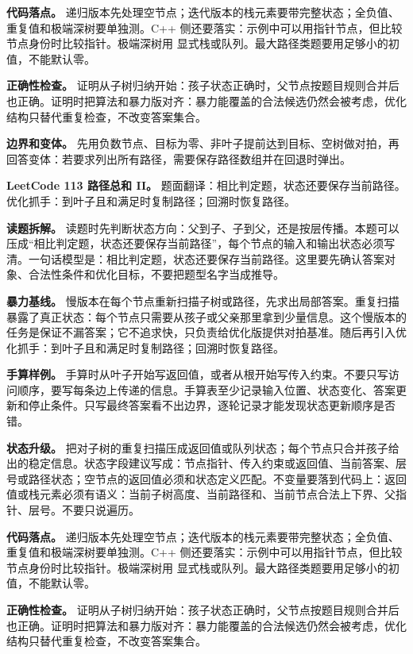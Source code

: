\textbf{代码落点。} 递归版本先处理空节点；迭代版本的栈元素要带完整状态；全负值、重复值和极端深树要单独测。C++ 侧还要落实：示例中可以用指针节点，但比较节点身份时比较指针。极端深树用  显式栈或队列。最大路径类题要用足够小的初值，不能默认零。

\textbf{正确性检查。} 证明从子树归纳开始：孩子状态正确时，父节点按题目规则合并后也正确。证明时把算法和暴力版对齐：暴力能覆盖的合法候选仍然会被考虑，优化结构只替代重复检查，不改变答案集合。

\textbf{边界和变体。} 先用负数节点、目标为零、非叶子提前达到目标、空树做对拍，再回答变体：若要求列出所有路径，需要保存路径数组并在回退时弹出。

\noindent\textbf{LeetCode 113 路径总和 II。} 题面翻译：相比判定题，状态还要保存当前路径。优化抓手：到叶子且和满足时复制路径；回溯时恢复路径。

\textbf{读题拆解。} 读题时先判断状态方向：父到子、子到父，还是按层传播。本题可以压成“相比判定题，状态还要保存当前路径”，每个节点的输入和输出状态必须写清。一句话模型是：相比判定题，状态还要保存当前路径。这里要先确认答案对象、合法性条件和优化目标，不要把题型名字当成推导。

\textbf{暴力基线。} 慢版本在每个节点重新扫描子树或路径，先求出局部答案。重复扫描暴露了真正状态：每个节点只需要从孩子或父亲那里拿到少量信息。这个慢版本的任务是保证不漏答案；它不追求快，只负责给优化版提供对拍基准。随后再引入优化抓手：到叶子且和满足时复制路径；回溯时恢复路径。

\textbf{手算样例。} 手算时从叶子开始写返回值，或者从根开始写传入约束。不要只写访问顺序，要写每条边上传递的信息。手算表至少记录输入位置、状态变化、答案更新和停止条件。只写最终答案看不出边界，逐轮记录才能发现状态更新顺序是否错。

\textbf{状态升级。} 把对子树的重复扫描压成返回值或队列状态；每个节点只合并孩子给出的稳定信息。状态字段建议写成：节点指针、传入约束或返回值、当前答案、层号或路径状态；空节点的返回值必须和状态定义匹配。不变量要落到代码上：返回值或栈元素必须有语义：当前子树高度、当前路径和、当前节点合法上下界、父指针、层号。不要只说遍历。

\textbf{代码落点。} 递归版本先处理空节点；迭代版本的栈元素要带完整状态；全负值、重复值和极端深树要单独测。C++ 侧还要落实：示例中可以用指针节点，但比较节点身份时比较指针。极端深树用  显式栈或队列。最大路径类题要用足够小的初值，不能默认零。

\textbf{正确性检查。} 证明从子树归纳开始：孩子状态正确时，父节点按题目规则合并后也正确。证明时把算法和暴力版对齐：暴力能覆盖的合法候选仍然会被考虑，优化结构只替代重复检查，不改变答案集合。


